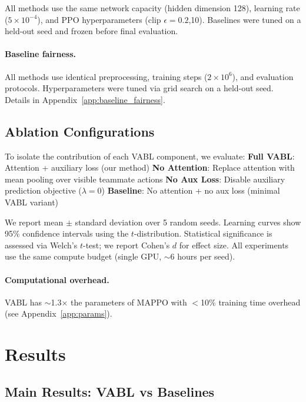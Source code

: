 \documentclass{article}
\theoremstyle{plain}
\theoremstyle{definition}
\theoremstyle{remark}
\begin{document}
All methods use the same network capacity (hidden dimension 128), learning rate ($5 \times 10^{-4}$), and PPO hyperparameters (clip $\epsilon = 0.2$,10). Baselines were tuned on a held-out seed and frozen before final evaluation.

\paragraph{Baseline fairness.}
All methods use identical preprocessing, training steps ($2 \times 10^6$), and evaluation protocols. Hyperparameters were tuned via grid search on a held-out seed. Details in Appendix~\ref{app:baseline_fairness}.

\subsection{Ablation Configurations}
To isolate the contribution of each VABL component, we evaluate:
\textbf{Full VABL}: Attention + auxiliary loss (our method)
\textbf{No Attention}: Replace attention with mean pooling over visible teammate actions
\textbf{No Aux Loss}: Disable auxiliary prediction objective ($\lambda = 0$)
\textbf{Baseline}: No attention + no aux loss (minimal VABL variant)

We report mean $\pm$ standard deviation over 5 random seeds. Learning curves show 95\% confidence intervals using the $t$-distribution. Statistical significance is assessed via Welch's $t$-test; we report Cohen's $d$ for effect size. All experiments use the same compute budget (single GPU, $\sim$6 hours per seed).

\paragraph{Computational overhead.}
VABL has $\sim$1.3$\times$ the parameters of MAPPO with $<$10\% training time overhead (see Appendix~\ref{app:params}).

\section{Results}
\label{sec:results}

\subsection{Main Results: VABL vs Baselines}
\end{document}
